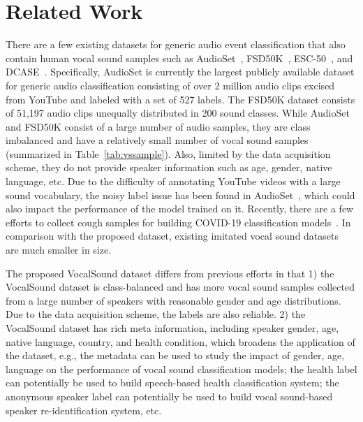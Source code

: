 \documentclass{article}
\newcommand{\squeezeup}{\vspace{-1.6mm}}
\begin{document}
\squeezeup\squeezeup
\section{Related Work}
\squeezeup
\label{sec:related}

There are a few existing datasets for generic audio event classification that also contain human vocal sound samples such as AudioSet~\cite{gemmeke2017audio}, FSD50K~\cite{fonseca2020fsd50k}, ESC-50~\cite{piczak2015esc}, and DCASE~\cite{mesaros2017dcase}. Specifically, AudioSet is currently the largest publicly available dataset for generic audio classification consisting of over 2 million audio clips excised from YouTube and labeled with a set of 527 labels. The FSD50K dataset consists of 51,197 audio clips unequally distributed in 200 sound classes. While AudioSet and FSD50K consist of a large number of audio samples, they are class imbalanced and have a relatively small number of vocal sound samples (summarized in Table~\ref{tab:vssample}). Also, limited by the data acquisition scheme, they do not provide speaker information such as age, gender, native language, etc. Due to the difficulty of annotating YouTube videos with a large sound vocabulary, the noisy label issue has been found in AudioSet~\cite{gong2021psla,fonseca2020addressing,shah2018closer}, which could also impact the performance of the model trained on it. Recently, there are a few efforts to collect cough samples for building COVID-19 classification models~\cite{orlandic2020coughvid,laguarta2020covid,brown2020exploring,cohen2020novel,imran2020ai4covid,schuller2021interspeech,bagad2020cough}. In comparison with the proposed dataset, existing imitated vocal sound datasets~\cite{kim2018vocal,cartwright2015vocalsketch} are much smaller in size.

The proposed VocalSound dataset differs from previous efforts in that 1) the VocalSound dataset is class-balanced and has more vocal sound samples collected from a large number of speakers with reasonable gender and age distributions. Due to the data acquisition scheme, the labels are also reliable. 2) the VocalSound dataset has rich meta information, including speaker gender, age, native language, country, and health condition, which broadens the application of the dataset, e.g., the metadata can be used to study the impact of gender, age, language on the performance of vocal sound classification models; the health label can potentially be used to build speech-based health classification system; the anonymous speaker label can potentially be used to build vocal sound-based speaker re-identification system, etc.
\end{document}

